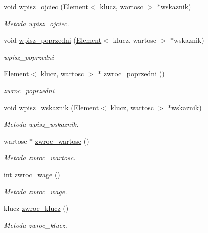 \begin{DoxyCompactItemize}
void \hyperlink{class_element_a9d169d81af34f308bc80b6fdcc87e139}{wpisz\+\_\+ojciec} (\hyperlink{class_element}{Element}$<$ klucz, wartosc $>$ $\ast$wskaznik)
\begin{DoxyCompactList}\small\item\em Metoda wpisz\+\_\+ojciec. \end{DoxyCompactList}\item 
void \hyperlink{class_element_a6ab51e5d69107de1121434d300ca87c7}{wpisz\+\_\+poprzedni} (\hyperlink{class_element}{Element}$<$ klucz, wartosc $>$ $\ast$wskaznik)
\begin{DoxyCompactList}\small\item\em wpisz\+\_\+poprzedni \end{DoxyCompactList}\item 
\hyperlink{class_element}{Element}$<$ klucz, wartosc $>$ $\ast$ \hyperlink{class_element_a32761a985f9d8700cc6f6026d3d0510f}{zwroc\+\_\+poprzedni} ()
\begin{DoxyCompactList}\small\item\em zwroc\+\_\+poprzedni \end{DoxyCompactList}\item 
void \hyperlink{class_element_ac2dd0d138001f2de876f306b83298914}{wpisz\+\_\+wskaznik} (\hyperlink{class_element}{Element}$<$ klucz, wartosc $>$ $\ast$wskaznik)
\begin{DoxyCompactList}\small\item\em Metoda wpisz\+\_\+wskaznik. \end{DoxyCompactList}\item 
wartosc $\ast$ \hyperlink{class_element_a1cfca5911c61ac275fd60c9d9c173b6d}{zwroc\+\_\+wartosc} ()
\begin{DoxyCompactList}\small\item\em Metoda zwroc\+\_\+wartosc. \end{DoxyCompactList}\item 
int \hyperlink{class_element_a748fcfad2139d088fd7f612578663909}{zwroc\+\_\+wage} ()
\begin{DoxyCompactList}\small\item\em Metoda zwroc\+\_\+wage. \end{DoxyCompactList}\item 
klucz \hyperlink{class_element_a4041559698851d33d77d9c457f3a5da4}{zwroc\+\_\+klucz} ()
\begin{DoxyCompactList}\small\item\em Metoda zwroc\+\_\+klucz. \end{DoxyCompactList}\item 

\end{DoxyCompactItemize}
